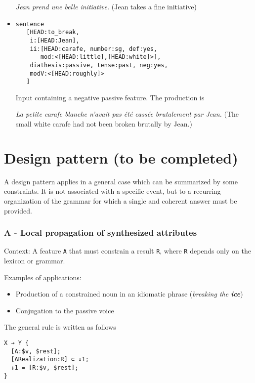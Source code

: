 \documentclass[11pt]{article}
\begin{document}
\begin{itemize}
\begin{exe}
\ex \textit{Jean prend une belle initiative.}  (Jean takes a fine initiative)
\end{exe}

\item 
\begin{verbatim}
sentence 
   [HEAD:to_break,
    i:[HEAD:Jean], 
    ii:[HEAD:carafe, number:sg, def:yes, 
       mod:<[HEAD:little],[HEAD:white]>], 
    diathesis:passive, tense:past, neg:yes, 
    modV:<[HEAD:roughly]>
   ]
\end{verbatim}

Input containing a negative passive feature. The
production is
\begin{exe}
\ex \textit{La petite carafe blanche n'avait pas été cassée
brutalement par Jean.} (The small white carafe had not been broken
brutally by Jean.)
\end{exe}

\end{itemize}

\section{Design pattern (to be completed)}

A design pattern applies in a general case which can be summarized by
some constraints. It is not associated with a specific event, but to a
recurring organization of the grammar for which a single and coherent
answer must be provided.

\subsubsection*{A - Local propagation of synthesized attributes}

Context:
A feature \texttt{A} that must constrain a result \texttt{R}, where
\texttt{R} depends only on the lexicon or grammar.

Examples of applications:
\begin{itemize}
\item Production of a constrained noun in an idiomatic phrase
  (\textit{breaking the \textbf{ice}})
\item Conjugation to the passive voice
\end{itemize}

The general rule is written as follows

\begin{lstlisting}
X → Y {
  [A:$v, $rest];
  [ARealization:R] ⊂ ⇓1;
  ↓1 = [R:$v, $rest];
}
\end{lstlisting}
\end{document}
